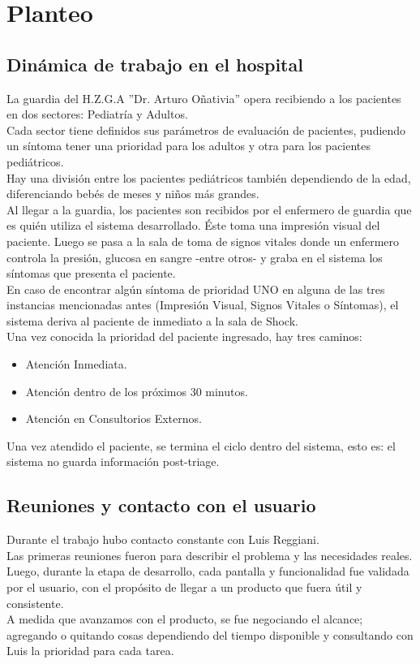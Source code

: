 \section{Planteo}
\subsection{Dinámica de trabajo en el hospital}
La guardia del H.Z.G.A ''Dr. Arturo Oñativia'' opera recibiendo a los pacientes en dos sectores: Pediatría y Adultos. \\
Cada sector tiene definidos sus parámetros de evaluación de pacientes, pudiendo un síntoma tener una prioridad para los adultos y otra para los pacientes pediátricos.\\
Hay una división entre los pacientes pediátricos también dependiendo de la edad, diferenciando bebés de meses y niños más grandes.\\
Al llegar a la guardia, los pacientes son recibidos por el enfermero de guardia que es quién utiliza el sistema desarrollado. Éste toma una impresión visual del paciente. Luego se pasa a la sala de toma de signos vitales donde un enfermero controla la presión, glucosa en sangre -entre otros- y graba en el sistema los síntomas que presenta el paciente. \\
En caso de encontrar algún síntoma de prioridad UNO en alguna de las tres instancias mencionadas antes (Impresión Visual, Signos Vitales o Síntomas), el sistema deriva al paciente de inmediato a la sala de Shock.  \\
Una vez conocida la prioridad del paciente ingresado, hay tres caminos: 
\begin{itemize}
\item Atención Inmediata.
\item Atención dentro de los próximos 30 minutos. 
\item Atención en Consultorios Externos.
\end{itemize}
Una vez atendido el paciente, se termina el ciclo dentro del sistema, esto es: el sistema no guarda información post-triage. \\


\subsection{Reuniones y contacto con el usuario}

Durante el trabajo hubo contacto constante con Luis Reggiani.\\
Las primeras reuniones fueron para describir el problema y las necesidades reales. \\
Luego, durante la etapa de desarrollo, cada pantalla y funcionalidad fue validada por el usuario, con el propósito de llegar a un producto que fuera útil y consistente. \\
A medida que avanzamos con el producto, se fue negociando el alcance; agregando o quitando cosas dependiendo del tiempo disponible y consultando con Luis la prioridad para cada tarea.


